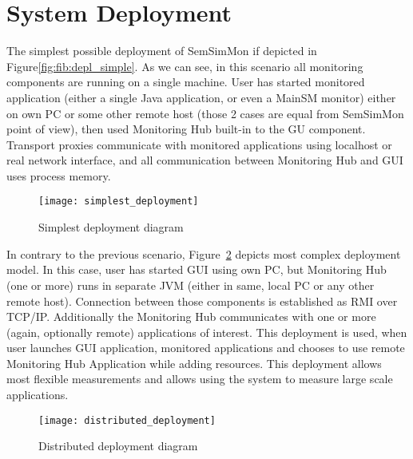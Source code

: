 %


\section{System Deployment}
\label{sec:deployments}

The simplest possible deployment of SemSimMon if depicted in Figure\ref{fig:fib:depl_simple}. As we can see, in this scenario all monitoring components are running on a single machine. User has started monitored application (either a single Java application, or even a MainSM monitor) either on own PC or some other remote host (those 2 cases are equal from SemSimMon point of view), then used Monitoring Hub built-in to the GU component. Transport proxies communicate with monitored applications using localhost or real network interface, and all communication between Monitoring Hub and GUI uses process memory.

\begin{figure}[h]
   \centering
   \texttt{[image: simplest\_deployment]}
   \caption{Simplest deployment diagram}
   \label{fib:depl_simple}
 \end{figure}
 
In contrary to the previous scenario, Figure~\ref{fig:depl_complex} depicts most complex deployment model. In this case, user has started GUI using own PC, but Monitoring Hub (one or more) runs in separate JVM (either in same, local PC or any other remote host). Connection between those components is established as RMI over TCP/IP. Additionally the Monitoring Hub communicates with one or more (again, optionally remote) applications of interest. This deployment is used, when user launches GUI application, monitored applications and chooses to use remote Monitoring Hub Application while adding resources. This deployment allows most flexible measurements and allows using the system to measure large scale applications.

\begin{figure}[h]
   \centering
   \texttt{[image: distributed\_deployment]}
   \caption{Distributed deployment diagram}
   \label{fig:depl_complex}
 \end{figure}
